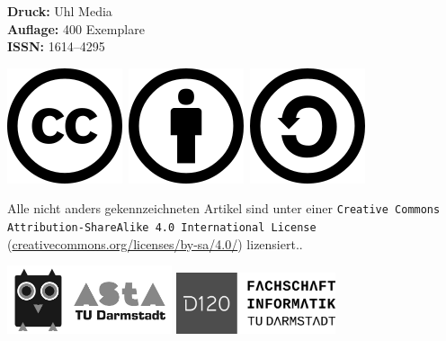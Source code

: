 \vspace{3mm}
\textbf{Druck:} Uhl Media\\
\textbf{Auflage:} 400 Exemplare\\
\textbf{ISSN:} 1614–4295

\vspace{3mm}
\begin{minipage}{0.2\textwidth}
\includegraphics[scale=.3]{grafik/cc}~\includegraphics[scale=.3]{grafik/by}~\includegraphics[scale=.3]{grafik/sa}
\end{minipage}
\begin{minipage}{0.8\textwidth}
Alle nicht anders gekennzeichneten Artikel sind unter einer \texttt{Creative Commons
Attribution-ShareAlike 4.0 International License}
(\url{creativecommons.org/licenses/by-sa/4.0/}) lizensiert..
\end{minipage}

\vspace{3mm}
\includegraphics[height=20mm]{grafik/eule_final_orange} \hspace{8mm}
\includegraphics[height=18mm]{grafik/logo_ohne_rand}

\pagebreak
